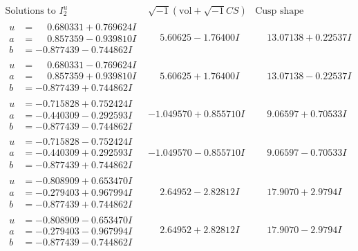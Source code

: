 \documentclass[1p]{elsarticle_modified}
\theoremstyle{definition}
\newcommand{\I}{\sqrt{-1}}
\begin{document}
$$\begin{array}{c|c|c}  
\text{Solutions to }I^u_{2}& \I (\text{vol} + \sqrt{-1}CS) & \text{Cusp shape}\\
 \hline 
\begin{aligned}
u &= \phantom{-}0.680331 + 0.769624 I \\
a &= \phantom{-}0.857359 - 0.939810 I \\
b &= -0.877439 - 0.744862 I\end{aligned}
 & \phantom{-}5.60625 - 1.76400 I & \phantom{-}13.07138 + 0.22537 I \\ \hline\begin{aligned}
u &= \phantom{-}0.680331 - 0.769624 I \\
a &= \phantom{-}0.857359 + 0.939810 I \\
b &= -0.877439 + 0.744862 I\end{aligned}
 & \phantom{-}5.60625 + 1.76400 I & \phantom{-}13.07138 - 0.22537 I \\ \hline\begin{aligned}
u &= -0.715828 + 0.752424 I \\
a &= -0.440309 - 0.292593 I \\
b &= -0.877439 - 0.744862 I\end{aligned}
 & -1.049570 + 0.855710 I & \phantom{-}9.06597 + 0.70533 I \\ \hline\begin{aligned}
u &= -0.715828 - 0.752424 I \\
a &= -0.440309 + 0.292593 I \\
b &= -0.877439 + 0.744862 I\end{aligned}
 & -1.049570 - 0.855710 I & \phantom{-}9.06597 - 0.70533 I \\ \hline\begin{aligned}
u &= -0.808909 + 0.653470 I \\
a &= -0.279403 + 0.967994 I \\
b &= -0.877439 + 0.744862 I\end{aligned}
 & \phantom{-}2.64952 - 2.82812 I & \phantom{-}17.9070 + 2.9794 I \\ \hline\begin{aligned}
u &= -0.808909 - 0.653470 I \\
a &= -0.279403 - 0.967994 I \\
b &= -0.877439 - 0.744862 I\end{aligned}
 & \phantom{-}2.64952 + 2.82812 I & \phantom{-}17.9070 - 2.9794 I \\ \hline\begin{aligned}

\end{aligned}
\end{array}$$
\end{document}
